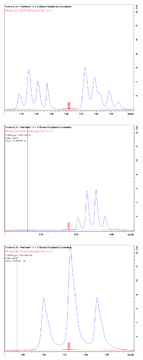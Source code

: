 \documentclass[a4paper]{article}
\newenvironment{Figure}
	{\par\medskip\noindent\minipage{\linewidth}}
	{\endminipage\par\medskip}
\begin{document}
\begin{multicols*}{2}
			
				\begin{Figure}
					\centering
					\includegraphics[width=7cm]{images/i_crop.PNG}
					\label{fig:ct}
					\vspace*{4mm}
				\end{Figure}
			
				
				\begin{Figure}
					\centering
					\includegraphics[width=7cm]{images/ii_crop.PNG}
					\label{fig:ct}
					\vspace*{4mm}
				\end{Figure}
			
			
				\begin{Figure}
					\centering
					\includegraphics[width=7cm]{images/iii_crop.PNG}
					\label{fig:ct}
					\vspace*{4mm}
				\end{Figure}
				
				
	
			
	\end{multicols*}
\end{document}
